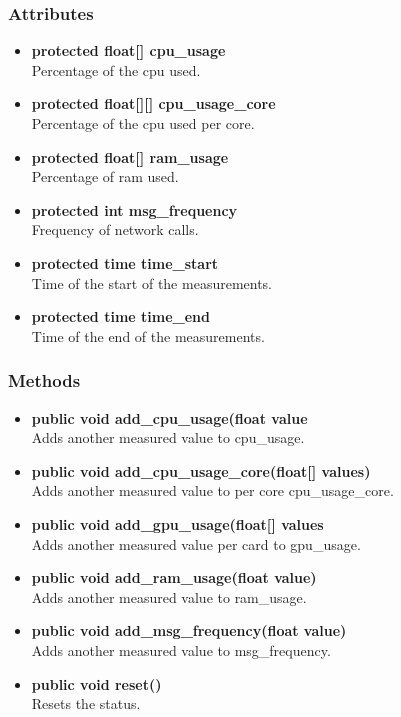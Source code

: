 \subsubsection{Attributes}
\begin{itemize}
	\item \textbf{protected float[] cpu\_usage }\\
	Percentage of the cpu used.
	\item \textbf{protected float[][] cpu\_usage\_core}\\
	Percentage of the cpu used per core.
	\item \textbf{protected float[] ram\_usage}\\
	Percentage of ram used.
	\item \textbf{protected int msg\_frequency}\\
	Frequency of network calls.
	\item \textbf{protected time time\_start}\\
	Time of the start of the measurements.
	\item \textbf{protected time time\_end}\\
	Time of the end of the measurements.
\end{itemize}

\subsubsection{Methods}
\begin{itemize}
	\item \textbf{public void add\_cpu\_usage(float value}\\
	Adds another measured value to cpu\_usage.
	\item \textbf{public void add\_cpu\_usage\_core(float[] values)}\\
	Adds another measured value to per core cpu\_usage\_core.
	\item \textbf{public void add\_gpu\_usage(float[] values}\\
	Adds another measured value per card to gpu\_usage.
	\item \textbf{public void add\_ram\_usage(float value)}\\
	Adds another measured value to ram\_usage.
	\item \textbf{public void add\_msg\_frequency(float value)}\\
	Adds another measured value to msg\_frequency.
	\item \textbf{public void reset()}\\
	Resets the status.
\end{itemize}

